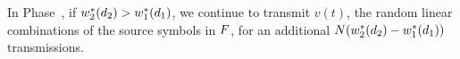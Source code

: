 In Phase~, if $w_{2}^{*}(d_2) > w_{1}^{*}(d_1)$, we continue to transmit $v(t)$, the random linear combinations of the source symbols in $F$, for an additional $N(w_{2}^{*}(d_2)- w_{1}^{*}(d_1))$ transmissions.





%
%
%
%
%
%
%
%
%

